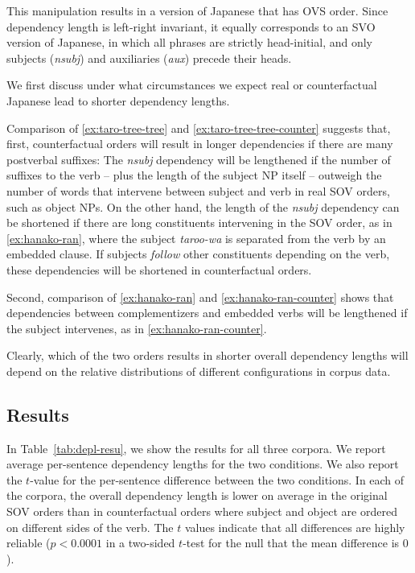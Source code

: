 \documentclass[11pt,a4paper]{article}
\begin{document}
This manipulation results in a version of Japanese that has OVS order.
Since dependency length is left-right invariant, it equally corresponds to an SVO version of Japanese, in which all phrases are strictly head-initial, and only subjects (\textit{nsubj}) and auxiliaries (\textit{aux}) precede their heads.


We first discuss under what circumstances we expect real or counterfactual Japanese lead to shorter dependency lengths. %

Comparison of \ref{ex:taro-tree-tree} and \ref{ex:taro-tree-tree-counter} suggests that, first, counterfactual orders will result in longer dependencies if there are many postverbal suffixes: The \textit{nsubj} dependency will be lengthened if the number of suffixes to the verb -- plus the length of the subject NP itself -- outweigh the number of words that intervene between subject and verb in real SOV orders, such as object NPs.
On the other hand, the length of the \textit{nsubj} dependency can be shortened if there are long constituents intervening in the SOV order, as in \ref{ex:hanako-ran}, where the subject \textit{taroo-wa} is separated from the verb by an embedded clause.
If subjects \emph{follow} other constituents depending on the verb, these dependencies will be shortened in counterfactual orders.

Second, comparison of \ref{ex:hanako-ran} and \ref{ex:hanako-ran-counter} shows that dependencies between complementizers and embedded verbs will be lengthened if the subject intervenes, as in \ref{ex:hanako-ran-counter}.

Clearly, which of the two orders results in shorter overall dependency lengths will depend on the relative distributions of different configurations in corpus data. %

\subsection{Results}
In Table~\ref{tab:depl-resu}, we show the results for all three corpora. %
We report average per-sentence dependency lengths for the two conditions. %
We also report the $t$-value for the per-sentence difference between the two conditions.
In each of the corpora, the overall dependency length is lower on average in the original SOV orders than in counterfactual orders where subject and object are ordered on different sides of the verb.
The $t$ values indicate that all differences are highly reliable ($p < 0.0001$ in a two-sided $t$-test for the null that the mean difference is $0$).
\end{document}
